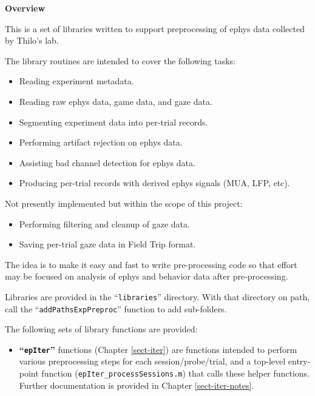 
\iffalse
%
\chapter{Overview}
%
\else
%
\vspace*{0.75in}
{\Huge \bfseries Overview}
\vspace*{\baselineskip}
\label{sect-over}
%
\fi

This is a set of libraries written to support preprocessing of ephys data
collected by Thilo's lab.

The library routines are intended to cover the following tasks:
\begin{itemize}
\item Reading experiment metadata.
\item Reading raw ephys data, game data, and gaze data.
\item Segmenting experiment data into per-trial records.
\item Performing artifact rejection on ephys data.
\item Assisting bad channel detection for ephys data.
\item Producing per-trial records with derived ephys signals (MUA, LFP, etc).
\end{itemize}

Not presently implemented but within the scope of this project:
\begin{itemize}
\item Performing filtering and cleanup of gaze data.
\item Saving per-trial gaze data in Field Trip format.
\end{itemize}

The idea is to make it easy and fast to write pre-processing code so that
effort may be focused on analysis of ephys and behavior data after
pre-processing.

Libraries are provided in the ``\texttt{libraries}'' directory. With that
directory on path, call the \linebreak ``\texttt{addPathsExpPreproc}''
function to add sub-folders.


The following sets of library functions are provided:
\begin{itemize}
%
\item \textbf{``\texttt{epIter}''} functions (Chapter \ref{sect-iter})
are functions intended to perform various preprocessing steps for each
session/probe/trial, and a top-level entry-point function
(\texttt{epIter\_processSessions.m}) that calls these helper functions.
Further documentation is provided in Chapter \ref{sect-iter-notes}.
%
\end{itemize}

